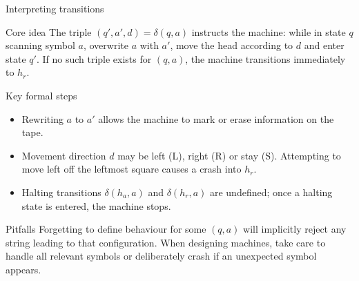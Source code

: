 \begin{frame}[t]{Interpreting transitions}
  \begin{tblock}{Core idea}
    The triple $(q',a',d)=\delta(q,a)$ instructs the machine: while in
    state $q$ scanning symbol $a$, overwrite $a$ with $a'$, move the head
    according to $d$ and enter state $q'$.  If no such triple exists
    for $(q,a)$, the machine transitions immediately to $h_r$.
  \end{tblock}
  \begin{tblock}{Key formal steps}
    \begin{itemize}
      \item Rewriting $a$ to $a'$ allows the machine to mark or erase
        information on the tape.
      \item Movement direction $d$ may be left (L), right (R) or stay
        (S).  Attempting to move left off the leftmost square causes a
        crash into $h_r$.
      \item Halting transitions $\delta(h_a,a)$ and $\delta(h_r,a)$ are
        undefined; once a halting state is entered, the machine stops.
    \end{itemize}
  \end{tblock}
  \begin{talert}{Pitfalls}
    Forgetting to define behaviour for some $(q,a)$ will implicitly
    reject any string leading to that configuration.  When designing
    machines, take care to handle all relevant symbols or deliberately
    crash if an unexpected symbol appears.
  \end{talert}
  \label{fr:7.1-09}
\end{frame}

